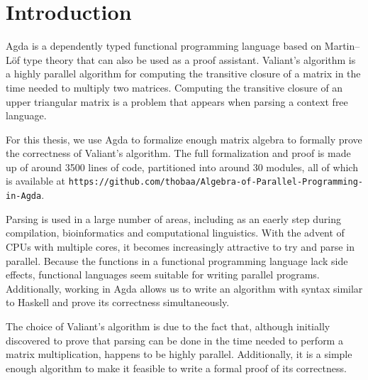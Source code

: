 \section{Introduction}
Agda is a dependently typed functional programming language based on Martin--Löf type theory that can also be used as a proof assistant. Valiant's algorithm is a highly parallel algorithm for computing the transitive closure of a matrix in the time needed to multiply two matrices. Computing the transitive closure of an upper triangular matrix is a problem that appears when parsing a context free language.

For this thesis, we use Agda to formalize enough matrix algebra to formally prove the correctness of Valiant's algorithm.
The full formalization and proof is made up of around 3500 lines of code, partitioned into around 30 modules, all of which is available at \verb¦https://github.com/thobaa/Algebra-of-Parallel-Programming-in-Agda¦.

% 


Parsing is used in a large number of areas, including as an eaerly step during compilation, bioinformatics and computational linguistics. 
With the advent of CPUs with multiple cores, it becomes increasingly attractive to try and parse in parallel.
Because the functions in a functional programming language lack side effects, functional languages seem suitable for writing parallel programs.
Additionally, working in Agda allows us to write an algorithm with syntax similar to Haskell and prove its correctness simultaneously.

The choice of Valiant's algorithm is due to the fact that, although initially discovered to prove that parsing can be done in the time needed to perform a matrix multiplication, happens to be highly parallel. Additionally, it is a simple enough algorithm to make it feasible to write a formal proof of its correctness.

